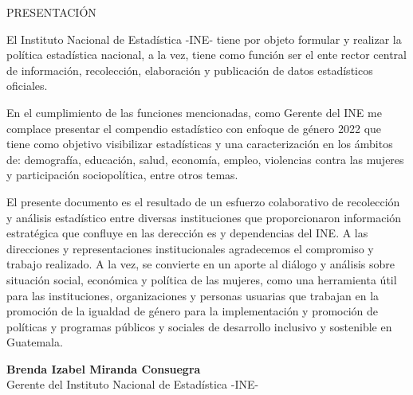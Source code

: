 $\ $\\[3cm]
\begin{center}
{\Bold \LARGE PRESENTACIÓN}\\[2cm]
\end{center}

El Instituto Nacional de Estadística -INE- tiene por objeto formular y realizar la política estadística nacional, a la vez, tiene como función ser el ente rector central de información, recolección, elaboración y publicación de datos estadísticos oficiales.  

En el cumplimiento de las funciones mencionadas, como Gerente del INE me complace presentar el compendio estadístico con enfoque de género 2022 que tiene como objetivo visibilizar estadísticas y una caracterización en los ámbitos de: demografía, educación, salud, economía, empleo, violencias contra las mujeres y participación sociopolítica, entre otros temas. 

El presente documento es el resultado de un esfuerzo colaborativo de recolección y análisis estadístico entre diversas instituciones que proporcionaron información estratégica que confluye en las derección es y dependencias del INE. A las direcciones y representaciones institucionales agradecemos el compromiso y trabajo realizado. A la vez, se convierte en un aporte al diálogo y análisis sobre situación social, económica y política de las mujeres, como una herramienta útil para las instituciones, organizaciones y personas usuarias que trabajan en la promoción de la igualdad de género para la implementación y promoción de políticas y programas públicos y sociales de desarrollo inclusivo y sostenible en Guatemala.\\[1cm]

\begin{center}
\textbf{Brenda Izabel Miranda Consuegra}\\[0.2cm]
Gerente del Instituto Nacional de Estadística -INE-
\end{center}

